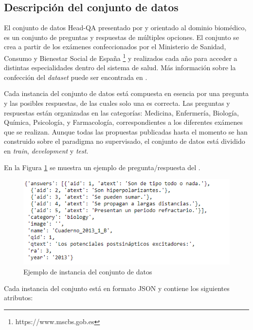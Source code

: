\subsection{Descripción del conjunto de datos}

El conjunto de datos Head-QA presentado por \cite{2019-head-qa} y orientado al dominio biomédico, es un conjunto de preguntas y respuestas de múltiples opciones. El conjunto se crea a partir de los exámenes confeccionados por el Ministerio de Sanidad, Consumo y Bienestar Social de España \footnote{https://www.mscbs.gob.es} y realizados cada año para acceder a distintas especialidades dentro del sistema de salud. Más información sobre la confección del \textit{dataset} puede ser encontrada en \cite{2019-head-qa}.

Cada instancia del conjunto de datos está compuesta en esencia por una pregunta y las posibles respuestas, de las cuales solo una es correcta. Las preguntas y respuestas están organizadas en las categorías: Medicina, Enfermería, Biología, Química, Psicología, y Farmacología, correspondientes a los diferentes exámenes que se realizan. Aunque todas las propuestas publicadas hasta el momento se han construido sobre el paradigma no supervisado, el conjunto de datos está dividido en \textit{train}, \textit{development} y \textit{test}.

En la Figura \ref{sample} se muestra un ejemplo de pregunta/respuesta del . 

\begin{figure}[!tb]
  \begin{center}
    \includegraphics[angle=0, width=1\textwidth]{Graphics/sample.png}
  \end{center}
    \caption{Ejemplo de instancia del conjunto de datos}\label{sample}
\end{figure}

Cada instancia del conjunto está en formato JSON y contiene los siguientes atributos:

